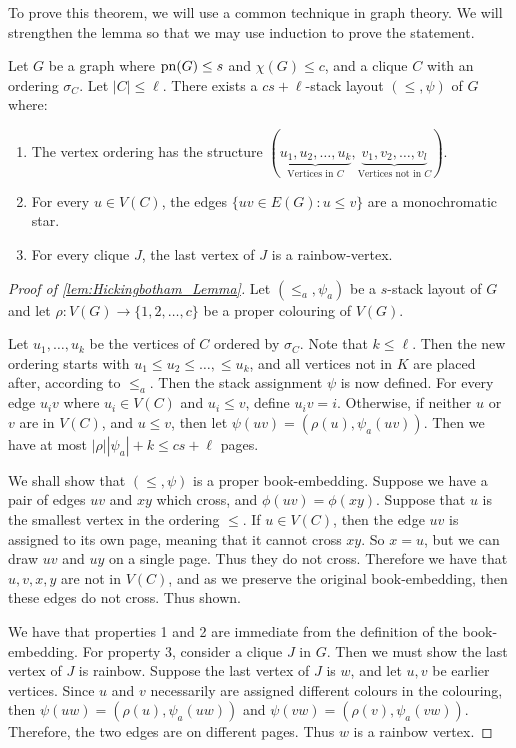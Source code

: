 To prove this theorem, we will use a common technique in graph theory. We will strengthen the lemma so that we may use induction to prove the statement.
\begin{lemma}\label{lem:Hickingbotham_Lemma}
	Let \(G\) be a graph where \(\operatorname{pn}(G) \leq s\) and \(\chi(G) \leq c\), and a clique \(C\) with an ordering \(\sigma_C\). Let \(|C| \leq \ell\). There exists a \(cs + \ell\)-stack layout \((\leq, \psi)\) of \(G\) where:
	\begin{enumerate}
		\item The vertex ordering has the structure \((\underbrace{u_1, u_2, \ldots, u_k}_{\text{Vertices in } C}, \underbrace{v_1, v_2, \ldots, v_l}_{\text{Vertices not in }C})\). 
		\item For every \(u \in V(C)\), the edges \(\lbrace uv \in E(G) : u \leq v \rbrace\) are a monochromatic star. 
		\item For every clique \(J\), the last vertex of \(J\) is a rainbow-vertex. 
	\end{enumerate}
\end{lemma}
\begin{proof}[Proof of \cref{lem:Hickingbotham_Lemma}]
	Let \((\leq_a, \psi_a)\) be a \(s\)-stack layout of \(G\) and let \(\rho: V(G) \rightarrow \lbrace 1, 2, \ldots, c\rbrace\) be a proper colouring of \(V(G)\).
	
	Let \(u_1, \ldots, u_k\) be the vertices of \(C\) ordered by \(\sigma_C\). Note that \(k \leq \ell\). Then the new ordering starts with \(u_1 \leq u_2 \leq \ldots, \leq u_k\), and all vertices not in \(K\) are placed after, according to \(\leq_a\).
	Then the stack assignment \(\psi\) is now defined. For every edge \(u_i v\) where \(u_i \in V(C)\) and \(u_i \leq v\), define \(u_i v = i\). Otherwise, if neither \(u\) or \(v\) are in \(V(C)\), and \(u \leq v\), then let \(\psi(uv) = (\rho(u), \psi_a(uv))\). Then we have at most \(|\rho| |\psi_a| + k \leq cs + \ell\) pages.
	
	We shall show that \((\leq, \psi)\) is a proper book-embedding. Suppose we have a pair of edges \(uv\) and \(xy\) which cross, and \(\phi(uv) = \phi(xy)\). Suppose that \(u\) is the smallest vertex in the ordering \(\leq\). If \(u \in V(C)\), then the edge \(uv\) is assigned to its own page, meaning that it cannot cross \(xy\). So \(x = u\), but we can draw \(uv\) and \(uy\) on a single page. Thus they do not cross. Therefore we have that \(u, v, x, y\) are not in \(V(C)\), and as we preserve the original book-embedding, then these edges do not cross. Thus shown.
	\par
	We have that properties 1 and 2 are immediate from the definition of the book-embedding. For property 3, consider a clique \(J\) in \(G\). Then we must show the last vertex of \(J\) is rainbow. Suppose the last vertex of \(J\) is \(w\), and let \(u, v\) be earlier vertices. Since \(u\) and \(v\) necessarily are assigned different colours in the colouring, then \(\psi(uw) = (\rho(u), \psi_a(uw))\) and \(\psi(vw) = (\rho(v), \psi_a(vw))\). Therefore, the two edges are on different pages. Thus \(w\) is a rainbow vertex. 
\end{proof}

